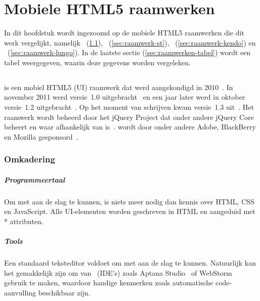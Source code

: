 \chapter{Mobiele HTML5 raamwerken}
\label{chap:raamwerken}


In dit hoofdstuk wordt ingezoomd op de mobiele HTML5 raamwerken die dit werk vergelijkt, namelijk \jqm{}~(\ref{sec:raamwerk-jqm}), \st{}~(\ref{sec:raamwerk-st}), \kendo{}~(\ref{sec:raamwerk-kendo}) en \lungo{}~(\ref{sec:raamwerk-lungo}).
In de laatste sectie (\ref{sec:raamwerken-tabel}) wordt een tabel weergegeven, waarin deze gegevens worden vergeleken.

\section{\jqm}
\label{sec:raamwerk-jqm}
\jqm{} is een mobiel HTML5  (UI) raamwerk dat werd aangekondigd in 2010~\cite{Resig2010}. 
In november 2011 werd versie~1.0 uitgebracht~\cite{Parker2011} en een jaar later werd in oktober versie~1.2 uitgebracht~\cite{Parker2012}. 
Op het moment van schrijven kwam versie~1.3 uit~\cite{Parker2013a}. 
Het raamwerk wordt beheerd door het jQuery Project dat onder andere jQuery Core beheert en waar \jqm{} afhankelijk van is~\cite{JQuery2012}. 
\jqm{} wordt door onder andere Adobe, BlackBerry en Mozilla gesponsord~\cite{JQuery2012a}.

\subsection{Omkadering}
\paragraph{Programmeertaal}
Om met \jqm{} aan de slag te kunnen, is niets meer nodig dan kennis over HTML, CSS en JavaScript. 
Alle UI-elementen worden geschreven in HTML en aangeduid met * attributen.

\paragraph{Tools}
Een standaard teksteditor voldoet om met \jqm{} aan de slag te kunnen. 
Natuurlijk kan het gemakkelijk zijn om van ~(IDE's) zoals Aptana Studio~\cite{Aptana2012} of WebStorm~\cite{JetBrains2012} gebruik te maken, waardoor handige kenmerken zoals automatische code-aanvulling beschikbaar zijn.

